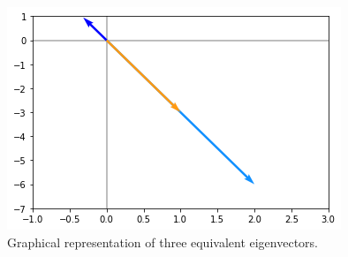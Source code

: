 \begin{figure}[htb]
	\centering
	\includegraphics[width=0.7\linewidth]{figures/eigenvectors}
	\caption{Graphical representation of three equivalent eigenvectors.}
	\label{fig:eigenvectors}
\end{figure}

